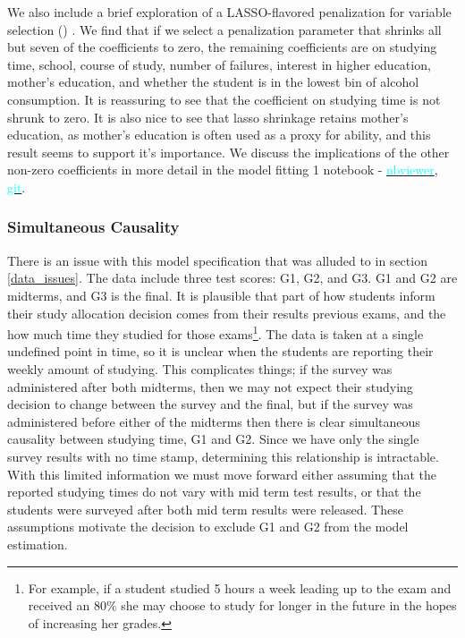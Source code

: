 \documentclass[12pt]{article}
\begin{document}
We also include a brief exploration of a LASSO-flavored penalization for variable selection (\cite{MLmetrics}) . We find that if we select a penalization parameter that shrinks all but seven of the coefficients to zero, the remaining coefficients are on studying time, school, course of study, number of failures, interest in higher education, mother's education, and whether the student is in the lowest bin of alcohol consumption. It is reassuring to see that the coefficient on studying time is not shrunk to zero. It is also nice to see that lasso shrinkage retains mother's education, as mother's education is often used as a proxy for ability, and this result seems to support it's importance. We discuss the implications of the other non-zero coefficients in more detail in the model fitting 1 notebook - \href{https://nbviewer.jupyter.org/github/nadavtadelis/Reproducible_Metrics/blob/master/model_fitting_1.ipynb}{\textcolor{cyan}{nbviewer}}, \href{https://github.com/nadavtadelis/Reproducible_Metrics/blob/master/model_fitting_1.ipynb}{\textcolor{cyan}{git}}.

\subsubsection{Simultaneous Causality} \label{simul_caus}
There is an issue with this model specification that was alluded to in section \ref{data_issues}. The data include three test scores: G1, G2, and G3. G1 and G2 are midterms, and G3 is the final. It is plausible that part of how students inform their study allocation decision comes from their results previous exams, and the how much time they studied for those exams\footnote{For example, if a student studied 5 hours a week leading up to the exam and received an 80\% she may choose to study for longer in the future in the hopes of increasing her grades.}. The data is taken at a single undefined point in time, so it is unclear when the students are reporting their weekly amount of studying. This complicates things; if the survey was administered after both midterms, then we may not expect their studying decision to change between the survey and the final, but if the survey was administered before either of the midterms then there is clear simultaneous causality between studying time, G1 and G2. Since we have only the single survey results with no time stamp, determining this relationship is intractable. With this limited information we must move forward either assuming that the reported studying times do not vary with mid term test results, or that the students were surveyed after both mid term results were released. These assumptions motivate the decision to exclude G1 and G2 from the model estimation.
\end{document}
